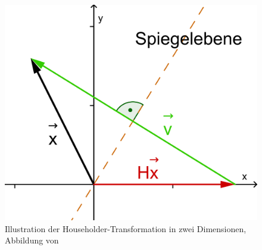 \begin{figure}
	\begin{center}
		\includegraphics[scale=0.1]{papers/francis/images/Householdertransformation.png}
		\caption{Illustration der Householder-Transformation in zwei Dimensionen, Abbildung von \cite{francis:householder}}
		\label{francis:abb:householder_transform}
	\end{center}
\end{figure}
